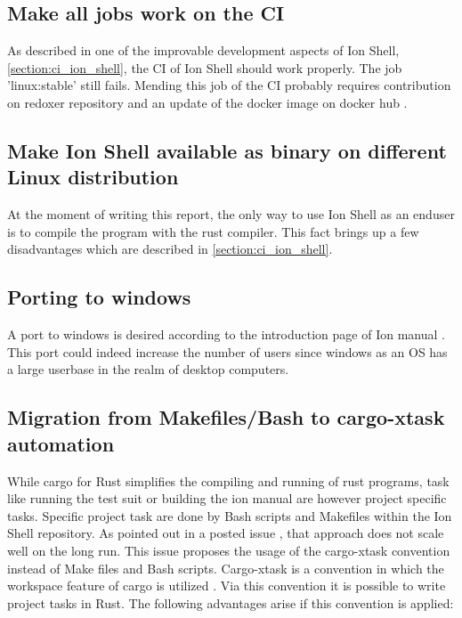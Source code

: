 \subsection{Make all jobs work on the CI}

As described in one of the improvable development aspects of Ion Shell, \ref{section:ci_ion_shell},
the CI of Ion Shell should work properly.
The job 'linux:stable' still fails.
Mending this job of the CI probably requires contribution
on redoxer repository \cite{link_repos_redoxer} and
an update of the docker image on docker hub \cite{docker_hub_redoxer}.

\subsection{Make Ion Shell available as binary on different Linux distribution}

At the moment of writing this report,
the only way to use Ion Shell as an enduser is to compile the program with the rust compiler.
This fact brings up a few disadvantages which are described in \ref{section:ci_ion_shell}.

\subsection{Porting to windows}

A port to windows is desired according to the introduction page of Ion manual \cite{ion_manual_instroduction}.
This port could indeed increase the number of users since windows
as an OS has a large userbase in the realm of desktop computers.

\subsection{Migration from Makefiles/Bash to cargo-xtask automation}

While cargo for Rust simplifies the compiling and running of rust programs,
task like running the test suit or building the ion manual are however project specific tasks.
Specific project task are done by Bash scripts and Makefiles within the Ion Shell repository.
As pointed out in a posted issue \cite{issue_convert_make_files_to_xtask},
that approach does not scale well on the long run.
This issue proposes the usage of the cargo-xtask convention instead of Make files and Bash scripts.
Cargo-xtask is a convention in which the workspace feature of cargo is utilized \cite{repos_cargo_xtask}.
Via this convention it is possible to write project tasks in Rust.
The following advantages arise if this convention is applied:

